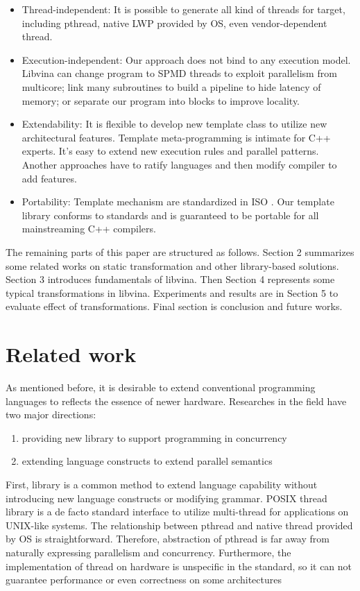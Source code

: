 \documentclass[10pt, conference, compsocconf]{IEEEtran}
\begin{document}
\begin{itemize}
\item Thread-independent:  It is possible to generate all kind of threads for target, including pthread, native LWP provided by OS, even vendor-dependent thread. 

\item Execution-independent:  Our approach does not bind to any execution model. Libvina can change program to SPMD threads to exploit parallelism from multicore; link many subroutines to build a pipeline to hide latency of memory; or separate our program into blocks to improve locality. 

\item Extendability:  It is flexible to develop new template class to utilize new architectural features. Template meta-programming is intimate for C++ experts. It's easy to extend new execution rules and parallel patterns. Another approaches have to ratify languages and then modify compiler to add features.

\item Portability: Template mechanism are standardized in ISO \cite{8, 17}. Our template library conforms to standards and is guaranteed to be portable for all mainstreaming C++ compilers.
\end{itemize}

The remaining parts of this paper are structured as follows. Section 2 summarizes some related works on static transformation and other library-based solutions. Section 3 introduces fundamentals of libvina. Then Section 4 represents some typical transformations in libvina. Experiments and results are in Section 5 to evaluate effect of transformations. Final section is conclusion and future works.

\section{Related work}
As mentioned before, it is desirable to extend conventional programming languages to reflects the essence of newer hardware. Researches in the field have two major directions:
\begin{enumerate}
\item providing new library to support programming in concurrency
\item extending language constructs to extend parallel semantics
\end{enumerate}

First, library is a common method to extend language capability without introducing new language constructs or modifying grammar. POSIX thread library is a de facto standard interface to utilize multi-thread for applications on UNIX-like systems. The relationship between pthread and native thread provided by OS is straightforward. Therefore, abstraction of pthread is far away from naturally expressing parallelism and concurrency. Furthermore, the implementation of thread on hardware is unspecific in the standard, so it can not guarantee performance or even correctness on some architectures \cite{4, 5}
\end{document}
